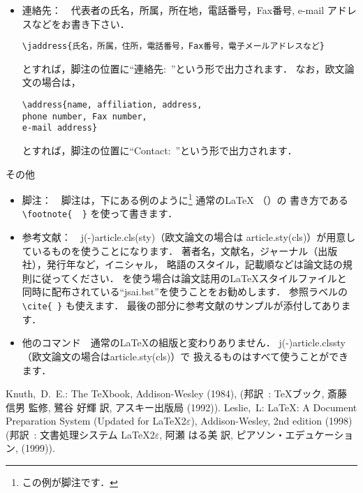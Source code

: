 \begin{itemize}
\item 連絡先：　代表者の氏名，所属，所在地，電話番号，Fax番号, 
e-mail アドレスなどをお書き下さい．
\begin{verbatim}
\jaddress{氏名，所属，住所，電話番号，Fax番号，電子メールアドレスなど}
\end{verbatim}
とすれば，脚注の位置に``連絡先:~''という形で出力されます．
なお，欧文論文の場合は，
\begin{verbatim}
\address{name, affiliation, address,
phone number, Fax number,
e-mail address}
\end{verbatim}
とすれば，脚注の位置に``Contact:~''という形で出力されます．
\end{itemize}

\Label その他
\begin{itemize}
\item 脚注：　脚注は，下にある例のように\footnote{この例が脚注です．}
通常の\LaTeX{}\linebreak
（\cite{latexブック}）の
書き方である\verb|\footnote{  }| を使って書きます．
\item 参考文献：　j(-)article.cls(sty)（欧文論文の場合は
article.sty(cls)）が用意しているものを使うことになります．
著者名，文献名，ジャーナル（出版社），発行年など，イニシャル，
略語のスタイル，記載順などは論文誌の規則に従ってください．
\JBibTeX{}を使う場合は論文誌用の\LaTeX{}スタイルファイルと
同時に配布されている``jsai.bst''を使うことをお勧めします．
参照ラベルの \verb|\cite{ }| も使えます．
最後の部分に参考文献のサンプルが添付してあります．
\item 他のコマンド　通常の\LaTeX{}の組版と変わりありません．
j(-)article.cls{sty}（欧文論文の場合はarticle.sty(cls)）で
扱えるものはすべて使うことができます．
\end{itemize}

\begin{thebibliography}{99}
 Knuth,~D.~E.: The \TeX{}book, Addison-Wesley (1984),
  (邦訳~: \TeX{}ブック, 斎藤 信男 監修, 鷺谷 好輝 訳,
  アスキー出版局 (1992)).
Leslie,~L: \LaTeX{}: {A} Document Preparation System (Updated for
  \LaTeX{}2$\varepsilon$), Addison-Wesley, 2nd edition (1998)
  (邦訳~: 文書処理システム \LaTeX{}2$\varepsilon$,
  阿瀬 はる美 訳, ピアソン・エデュケーション, (1999)).
\end{thebibliography}
